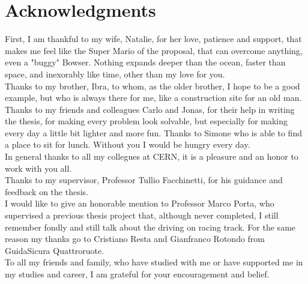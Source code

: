 \chapter*{Acknowledgments}

First, I am thankful to my wife, Natalie, for her love, patience and support, that makes me feel like the Super Mario of the proposal, that can overcome anything, even a "buggy" Bowser. Nothing expands deeper than the ocean, faster than space, and inexorably like time, other than my love for you.\\
Thanks to my brother, Ibra, to whom, as the older brother, I hope to be a good example, but who is always there for me, like a construction site for an old man.
Thanks to my friends and colleagues Carlo and Jonas, for their help in writing the thesis, for making every problem look solvable, but especially for making every day a little bit lighter and more fun. 
Thanks to Simone who is able to find a place to sit for lunch. Without you I would be hungry every day.\\
In general thanks to all my collegues at CERN, it is a pleasure and an honor to work with you all.\\
Thanks to my supervisor, Professor Tullio Facchinetti, for his guidance and feedback on the thesis.\\
I would like to give an honorable mention to Professor Marco Porta, who supervised a previous thesis project that, although never completed, I still remember fondly and still talk about the driving on racing track. For the same reason my thanks go to Cristiano Resta and Gianfranco Rotondo from GuidaSicura Quattroruote.\\
To all my friends and family, who have studied with me or have supported me in my studies and career, I am grateful for your encouragement and belief.\\

\thispagestyle{empty}
\mbox{}
\newpage
